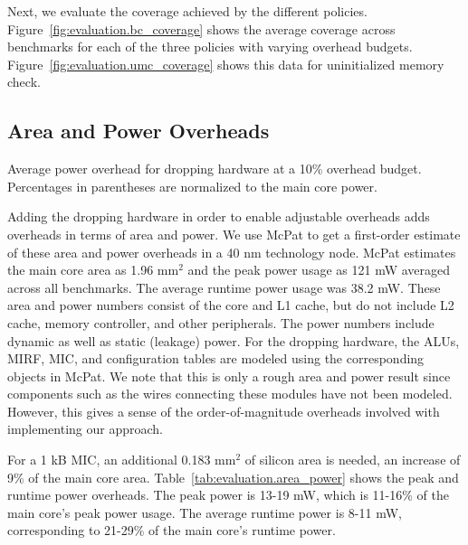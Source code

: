 Next, we evaluate the coverage achieved by the different policies.
Figure~\ref{fig:evaluation.bc_coverage} shows the average coverage across
benchmarks for each of the three policies with varying overhead budgets.
Figure~\ref{fig:evaluation.umc_coverage} shows this data for uninitialized
memory check.

\subsection{Area and Power Overheads}

\begin{table}[tb]
  \begin{center}
    \vspace{-0.0in}
    \begin{footnotesize}
    
    \end{footnotesize}
    \caption{Average power overhead for dropping hardware at a 10\% overhead
    budget. Percentages in parentheses are normalized to the main core
    power.}
    \vspace{-0.2in}
    \label{tab:evaluation.area_power}
  \end{center}
\end{table}

Adding the dropping hardware in order to enable adjustable overheads adds
overheads in terms of area and power. We use McPat \cite{mcpat-micro09} to get
a first-order estimate of these area and power overheads in a 40 nm technology
node. McPat estimates the main core area as 1.96 mm$^2$ and the peak power usage as
121 mW averaged across all benchmarks. The average runtime power usage was 38.2 
mW. These area and power numbers consist of the core and
L1 cache, but do not include L2 cache, memory controller, and other
peripherals. The power numbers include dynamic as well as static (leakage)
power. For the dropping hardware, the ALUs, MIRF, MIC, and
configuration tables are modeled using the corresponding objects in McPat. We
note that this is only a rough area and power result since components such as the
wires connecting these modules have not been modeled. However, this gives a
sense of the order-of-magnitude overheads involved with implementing our
approach.

For a 1 kB MIC, an additional 0.183 mm$^2$ of silicon area is needed, an
increase of 9\% of the main core area. Table~\ref{tab:evaluation.area_power}
shows the peak and runtime power overheads. The peak power is 13-19 mW, which is
11-16\% of the main core's peak power usage. The average runtime power is 8-11
mW, corresponding to 21-29\% of the main core's runtime power.

